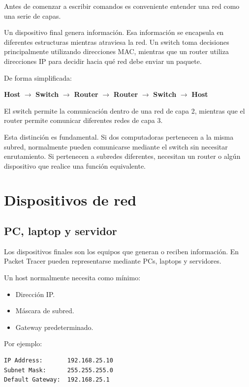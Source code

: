 \documentclass[12pt]{article}
\begin{document}
Antes de comenzar a escribir comandos es conveniente entender una red como
una serie de capas.

Un dispositivo final genera información. Esa información se encapsula en
diferentes estructuras mientras atraviesa la red. Un switch toma decisiones
principalmente utilizando direcciones MAC, mientras que un router utiliza
direcciones IP para decidir hacia qué red debe enviar un paquete.

De forma simplificada:

\begin{center}
\textbf{Host} $\rightarrow$ \textbf{Switch} $\rightarrow$
\textbf{Router} $\rightarrow$ \textbf{Router} $\rightarrow$
\textbf{Switch} $\rightarrow$ \textbf{Host}
\end{center}

El switch permite la comunicación dentro de una red de capa 2, mientras que
el router permite comunicar diferentes redes de capa 3.

Esta distinción es fundamental. Si dos computadoras pertenecen a la misma
subred, normalmente pueden comunicarse mediante el switch sin necesitar
enrutamiento. Si pertenecen a subredes diferentes, necesitan un router o
algún dispositivo que realice una función equivalente.


\section{Dispositivos de red}

\subsection{PC, laptop y servidor}

Los dispositivos finales son los equipos que generan o reciben información.
En Packet Tracer pueden representarse mediante PCs, laptops y servidores.

Un host normalmente necesita como mínimo:

\begin{itemize}
    \item Dirección IP.
    \item Máscara de subred.
    \item Gateway predeterminado.
\end{itemize}

Por ejemplo:

\begin{lstlisting}
IP Address:       192.168.25.10
Subnet Mask:      255.255.255.0
Default Gateway:  192.168.25.1
\end{lstlisting}
\end{document}

